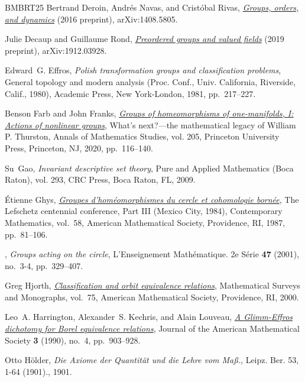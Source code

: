 \documentclass[reqno]{amsart}
\begin{document}
\begin{thebibliography}{BMBRT25}
Bertrand Deroin, Andr\'{e}s Navas, and Crist\'{o}bal Rivas, \href{https://arxiv.org/abs/1408.5805}{\emph{Groups, orders, and dynamics}} (2016 preprint), arXiv:1408.5805.

Julie Decaup and Guillaume Rond, \href{https://arxiv.org/abs/1912.03928}{\emph{Preordered groups and valued fields}} (2019 preprint), arXiv:1912.03928.

Edward~G. Effros, \emph{Polish transformation groups and classification problems}, General topology and modern analysis ({P}roc. {C}onf., {U}niv. {C}alifornia, {R}iverside, {C}alif., 1980), Academic Press, New York-London, 1981, pp.~217--227.

Benson Farb and John Franks, \href{https://doi.org/10.2307/j.ctvthhdvv.9}{\emph{Groups of homeomorphisms of one-manifolds, {I}: {A}ctions of nonlinear groups}}, What's next?---the mathematical legacy of {W}illiam {P}. {T}hurston, Annals of Mathematics Studies, vol. 205, Princeton University Press, Princeton, NJ, 2020, pp.~116--140.

Su~Gao, \emph{Invariant descriptive set theory}, Pure and Applied Mathematics (Boca Raton), vol. 293, CRC Press, Boca Raton, FL, 2009.

\'{E}tienne Ghys, \href{https://doi.org/10.24033/msmf.358}{\emph{Groupes d'hom\'{e}omorphismes du cercle et cohomologie born\'{e}e}}, The {L}efschetz centennial conference, {P}art {III} ({M}exico {C}ity, 1984), Contemporary Mathematics, vol.~58, American Mathematical Society, Providence, RI, 1987, pp.~81--106.

\bysame, \emph{Groups acting on the circle}, L'Enseignement Math\'{e}matique. 2e S\'{e}rie \textbf{47} (2001), no.~3-4, pp.~329--407.

Greg Hjorth, \href{https://doi.org/10.1090/surv/075}{\emph{Classification and orbit equivalence relations}}, Mathematical Surveys and Monographs, vol.~75, American Mathematical Society, Providence, RI, 2000.

Leo~A. Harrington, Alexander~S. Kechris, and Alain Louveau, \href{https://doi.org/10.2307/1990906}{\emph{A {G}limm-{E}ffros dichotomy for {B}orel equivalence relations}}, Journal of the American Mathematical Society \textbf{3} (1990), no.~4, pp.~903--928.

Otto H{\"o}lder, \emph{Die {Axiome} der {Quantit{\"a}t} und die {Lehre} vom {Ma{{\ss}}}.}, Leipz. {Ber}. 53, 1-64 (1901)., 1901.


\end{thebibliography}
\end{document}
